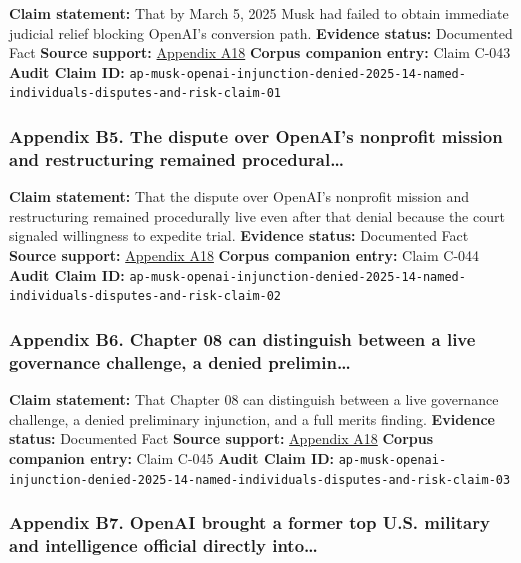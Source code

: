 \documentclass[
  american,
  11pt,
  letterpaper,
]{article}
\begin{document}
\textbf{Claim statement:} That by March 5, 2025 Musk had failed to
obtain immediate judicial relief blocking OpenAI's conversion path.
\textbf{Evidence status:} Documented Fact \textbf{Source support:}
\hyperref[appendix-a18-judge-denies-elon-musk-s-request-to-block-openai-for-profit-conversion-but-welcomes-trial]{Appendix
A18} \textbf{Corpus companion entry:} Claim C-043 \textbf{Audit Claim
ID:}
\texttt{ap-musk-openai-injunction-denied-2025-14-named-individuals-disputes-and-risk-claim-01}

\subsubsection{Appendix B5. The dispute over OpenAI's nonprofit mission
and restructuring remained
procedural\ldots{}}\label{appendix-b5-the-dispute-over-openai-s-nonprofit-mission-and-restructuring-remained-procedural}

\textbf{Claim statement:} That the dispute over OpenAI's nonprofit
mission and restructuring remained procedurally live even after that
denial because the court signaled willingness to expedite trial.
\textbf{Evidence status:} Documented Fact \textbf{Source support:}
\hyperref[appendix-a18-judge-denies-elon-musk-s-request-to-block-openai-for-profit-conversion-but-welcomes-trial]{Appendix
A18} \textbf{Corpus companion entry:} Claim C-044 \textbf{Audit Claim
ID:}
\texttt{ap-musk-openai-injunction-denied-2025-14-named-individuals-disputes-and-risk-claim-02}

\subsubsection{Appendix B6. Chapter 08 can distinguish between a live
governance challenge, a denied
prelimin\ldots{}}\label{appendix-b6-chapter-08-can-distinguish-between-a-live-governance-challenge-a-denied-prelimin}

\textbf{Claim statement:} That Chapter 08 can distinguish between a live
governance challenge, a denied preliminary injunction, and a full merits
finding. \textbf{Evidence status:} Documented Fact \textbf{Source
support:}
\hyperref[appendix-a18-judge-denies-elon-musk-s-request-to-block-openai-for-profit-conversion-but-welcomes-trial]{Appendix
A18} \textbf{Corpus companion entry:} Claim C-045 \textbf{Audit Claim
ID:}
\texttt{ap-musk-openai-injunction-denied-2025-14-named-individuals-disputes-and-risk-claim-03}

\subsubsection{Appendix B7. OpenAI brought a former top U.S. military
and intelligence official directly
into\ldots{}}\label{appendix-b7-openai-brought-a-former-top-u-s-military-and-intelligence-official-directly-into}
\end{document}
